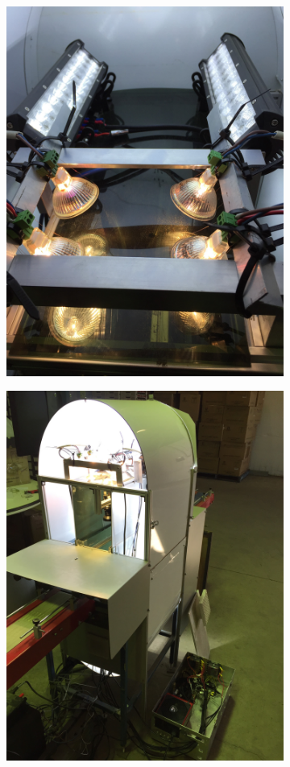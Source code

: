 \documentclass[fleqn,twoside,12pt]{report}
\begin{document}
\begin{figure}[ht]
	\centering
	\begin{subfigure}{.5\textwidth}
		\centering
		\includegraphics[width=.8\linewidth, angle=270]{halogen.jpg}
		\caption{}
		\label{fig:halogen}
	\end{subfigure}%
	\begin{subfigure}{.5\textwidth}
		\centering
		\includegraphics[width=.8\linewidth, angle=270]{system_construct_3.JPG}
		\caption{}
		\label{fig:lights_power}
	\end{subfigure}%


\end{figure}
\end{document}
